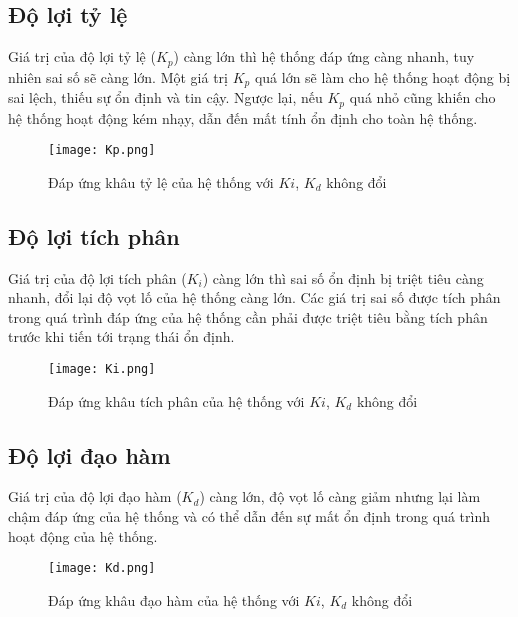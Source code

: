 \subsection{Độ lợi tỷ lệ}

Giá trị của độ lợi tỷ lệ ($K_p$) càng lớn thì hệ thống đáp ứng càng nhanh, tuy nhiên sai số sẽ càng lớn. Một giá trị $K_p$ quá lớn sẽ làm cho hệ thống hoạt động bị sai lệch, thiếu sự ổn định và tin cậy. Ngược lại, nếu $K_p$ quá nhỏ cũng khiến cho hệ thống hoạt động kém nhạy, dẫn đến mất tính ổn định cho toàn hệ thống.

\begin{figure}[h!]
	\centering
	\texttt{[image: Kp.png]}
	\caption[Đáp ứng khâu tỷ lệ của hệ thống với $Ki$, $K_d$ không đổi]{Đáp ứng khâu tỷ lệ của hệ thống với $Ki$, $K_d$ không đổi}
	\label{fig:Đáp ứng $K_p$}
\end{figure}

\newpage

\subsection{Độ lợi tích phân}

Giá trị của độ lợi tích phân ($K_i$) càng lớn thì sai số ổn định bị triệt tiêu càng nhanh, đổi lại độ vọt lố của hệ thống càng lớn. Các giá trị sai số được tích phân trong quá trình đáp ứng của hệ thống cần phải được triệt tiêu bằng tích phân trước khi tiến tới trạng thái ổn định. 

\begin{figure}[h!]
	\centering
	\texttt{[image: Ki.png]}
	\caption[Đáp ứng khâu tích phân của hệ thống với $Ki$, $K_d$ không đổi]{Đáp ứng khâu tích phân của hệ thống với $Ki$, $K_d$ không đổi}
	\label{fig:Đáp ứng $K_i$}
\end{figure}

\newpage

\subsection{Độ lợi đạo hàm}

Giá trị của độ lợi đạo hàm ($K_d$) càng lớn, độ vọt lố càng giảm nhưng lại làm chậm đáp ứng của hệ thống và có thể dẫn đến sự mất ổn định trong quá trình hoạt động của hệ thống.

\begin{figure}[h!]
	\centering
	\texttt{[image: Kd.png]}
	\caption[Đáp ứng khâu đạo hàm của hệ thống với $Ki$, $K_d$ không đổi]{Đáp ứng khâu đạo hàm của hệ thống với $Ki$, $K_d$ không đổi}
	\label{fig:Đáp ứng $K_d$}
\end{figure}

